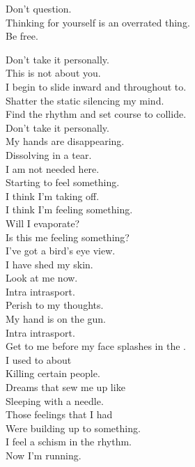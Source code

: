 Don't question. \\
Thinking for yourself is an overrated thing. \\
Be free. \\





Don't take it personally. \\
This is not about you. \\
I begin to slide inward and throughout to. \\
Shatter the static silencing my mind. \\
Find the rhythm and set course to collide. \\

Don't take it personally. \\
My hands are disappearing. \\
Dissolving in a tear. \\
I am not needed here. \\

Starting to feel something. \\
I think I'm taking off. \\
I think I'm feeling something. \\
Will I evaporate? \\
Is this me feeling something? \\
I've got a bird's eye view. \\
I have shed my skin. \\
Look at me now. \\

Intra intrasport. \\
Perish to my thoughts. \\
My hand is on the gun. \\
Intra intrasport. \\
Get to me before my face splashes in the . \\

I used to  about \\
Killing certain people. \\
Dreams that sew me up like \\
Sleeping with a needle. \\
Those feelings that I had \\
Were building up to something. \\
I feel a schism in the rhythm. \\
Now I'm running. \\

